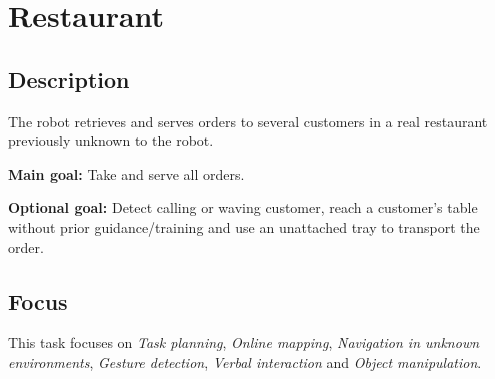 \section{Restaurant}
\label{test:restaurant}

\subsection*{Description}

The robot retrieves and serves orders to several customers in a real restaurant previously unknown to the robot.

\textbf{Main goal:}
	Take and serve all orders.
	
\textbf{Optional goal:}
	Detect calling or waving customer, reach a customer's table without prior guidance/training and use an unattached tray to transport the order.


\subsection*{Focus}
This task focuses on
\textit{Task planning},
\textit{Online mapping},
\textit{Navigation in unknown environments},
\textit{Gesture detection},
\textit{Verbal interaction} and
\textit{Object manipulation}.	

